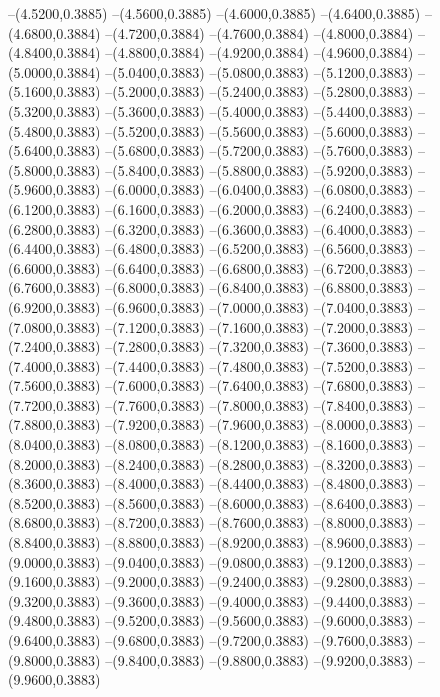 {	--(4.5200,0.3885)
	--(4.5600,0.3885)
	--(4.6000,0.3885)
	--(4.6400,0.3885)
	--(4.6800,0.3884)
	--(4.7200,0.3884)
	--(4.7600,0.3884)
	--(4.8000,0.3884)
	--(4.8400,0.3884)
	--(4.8800,0.3884)
	--(4.9200,0.3884)
	--(4.9600,0.3884)
	--(5.0000,0.3884)
	--(5.0400,0.3883)
	--(5.0800,0.3883)
	--(5.1200,0.3883)
	--(5.1600,0.3883)
	--(5.2000,0.3883)
	--(5.2400,0.3883)
	--(5.2800,0.3883)
	--(5.3200,0.3883)
	--(5.3600,0.3883)
	--(5.4000,0.3883)
	--(5.4400,0.3883)
	--(5.4800,0.3883)
	--(5.5200,0.3883)
	--(5.5600,0.3883)
	--(5.6000,0.3883)
	--(5.6400,0.3883)
	--(5.6800,0.3883)
	--(5.7200,0.3883)
	--(5.7600,0.3883)
	--(5.8000,0.3883)
	--(5.8400,0.3883)
	--(5.8800,0.3883)
	--(5.9200,0.3883)
	--(5.9600,0.3883)
	--(6.0000,0.3883)
	--(6.0400,0.3883)
	--(6.0800,0.3883)
	--(6.1200,0.3883)
	--(6.1600,0.3883)
	--(6.2000,0.3883)
	--(6.2400,0.3883)
	--(6.2800,0.3883)
	--(6.3200,0.3883)
	--(6.3600,0.3883)
	--(6.4000,0.3883)
	--(6.4400,0.3883)
	--(6.4800,0.3883)
	--(6.5200,0.3883)
	--(6.5600,0.3883)
	--(6.6000,0.3883)
	--(6.6400,0.3883)
	--(6.6800,0.3883)
	--(6.7200,0.3883)
	--(6.7600,0.3883)
	--(6.8000,0.3883)
	--(6.8400,0.3883)
	--(6.8800,0.3883)
	--(6.9200,0.3883)
	--(6.9600,0.3883)
	--(7.0000,0.3883)
	--(7.0400,0.3883)
	--(7.0800,0.3883)
	--(7.1200,0.3883)
	--(7.1600,0.3883)
	--(7.2000,0.3883)
	--(7.2400,0.3883)
	--(7.2800,0.3883)
	--(7.3200,0.3883)
	--(7.3600,0.3883)
	--(7.4000,0.3883)
	--(7.4400,0.3883)
	--(7.4800,0.3883)
	--(7.5200,0.3883)
	--(7.5600,0.3883)
	--(7.6000,0.3883)
	--(7.6400,0.3883)
	--(7.6800,0.3883)
	--(7.7200,0.3883)
	--(7.7600,0.3883)
	--(7.8000,0.3883)
	--(7.8400,0.3883)
	--(7.8800,0.3883)
	--(7.9200,0.3883)
	--(7.9600,0.3883)
	--(8.0000,0.3883)
	--(8.0400,0.3883)
	--(8.0800,0.3883)
	--(8.1200,0.3883)
	--(8.1600,0.3883)
	--(8.2000,0.3883)
	--(8.2400,0.3883)
	--(8.2800,0.3883)
	--(8.3200,0.3883)
	--(8.3600,0.3883)
	--(8.4000,0.3883)
	--(8.4400,0.3883)
	--(8.4800,0.3883)
	--(8.5200,0.3883)
	--(8.5600,0.3883)
	--(8.6000,0.3883)
	--(8.6400,0.3883)
	--(8.6800,0.3883)
	--(8.7200,0.3883)
	--(8.7600,0.3883)
	--(8.8000,0.3883)
	--(8.8400,0.3883)
	--(8.8800,0.3883)
	--(8.9200,0.3883)
	--(8.9600,0.3883)
	--(9.0000,0.3883)
	--(9.0400,0.3883)
	--(9.0800,0.3883)
	--(9.1200,0.3883)
	--(9.1600,0.3883)
	--(9.2000,0.3883)
	--(9.2400,0.3883)
	--(9.2800,0.3883)
	--(9.3200,0.3883)
	--(9.3600,0.3883)
	--(9.4000,0.3883)
	--(9.4400,0.3883)
	--(9.4800,0.3883)
	--(9.5200,0.3883)
	--(9.5600,0.3883)
	--(9.6000,0.3883)
	--(9.6400,0.3883)
	--(9.6800,0.3883)
	--(9.7200,0.3883)
	--(9.7600,0.3883)
	--(9.8000,0.3883)
	--(9.8400,0.3883)
	--(9.8800,0.3883)
	--(9.9200,0.3883)
	--(9.9600,0.3883)
}
